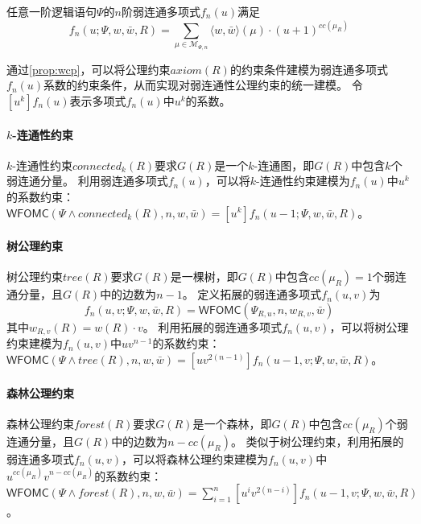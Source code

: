\documentclass[12pt,UTF8,AutoFakeBold=3,a4paper]{ctexart} %
\newcommand{\weight}{w}
\newcommand{\negweight}{\bar{w}}
\newcommand{\symwfomc}{\ensuremath{\mathsf{WFOMC}}}
\newcommand{\fomodels}[2]{\mathcal{M}_{#1, #2}}
\newcommand{\typeweight}[1]{\langle \weight, \negweight\rangle(#1)}
\begin{document}
\begin{proposition}\label{prop:wcp}
  任意一阶逻辑语句$\Psi$的$n$阶弱连通多项式$f_n(u)$满足
  \begin{equation*}
    f_n(u;\Psi, \weight, \negweight, R) = \sum_{\mu \in \fomodels{\Psi}{n}} \typeweight{\mu} \cdot (u+1)^{cc(\mu_R)}
  \end{equation*}
\end{proposition}

通过\cref{prop:wcp}，可以将公理约束$axiom(R)$的约束条件建模为弱连通多项式$f_n(u)$系数的约束条件，从而实现对弱连通性公理约束的统一建模。
令$[u^k] f_n(u)$表示多项式$f_n(u)$中$u^k$的系数。

\paragraph{$k$-连通性约束} $k$-连通性约束$connected_k(R)$要求$G(R)$是一个$k$-连通图，即$G(R)$中包含$k$个弱连通分量。
利用弱连通多项式$f_n(u)$，可以将$k$-连通性约束建模为$f_n(u)$中$u^k$的系数约束：$\symwfomc(\Psi \land connected_k(R), n, \weight, \negweight) = [u^k] f_n(u - 1; \Psi, \weight, \negweight, R)$。

\paragraph{树公理约束} 树公理约束$tree(R)$要求$G(R)$是一棵树，即$G(R)$中包含$cc(\mu_R) = 1$个弱连通分量，且$G(R)$中的边数为$n-1$。
定义拓展的弱连通多项式$f_n(u,v)$为
\begin{equation*}
  f_n(u, v; \Psi, \weight, \negweight, R) = \symwfomc(\Psi_{R,u}, n, \weight_{R,v}, \negweight)
\end{equation*}
其中$\weight_{R,v}(R) = \weight(R) \cdot v$。
利用拓展的弱连通多项式$f_n(u,v)$，可以将树公理约束建模为$f_n(u,v)$中$uv^{n-1}$的系数约束：$\symwfomc(\Psi \land tree(R), n, \weight, \negweight) = [uv^{2(n-1)} ] f_n(u-1, v; \Psi, \weight, \negweight, R)$。

\paragraph{森林公理约束} 森林公理约束$forest(R)$要求$G(R)$是一个森林，即$G(R)$中包含$cc(\mu_R)$个弱连通分量，且$G(R)$中的边数为$n - cc(\mu_R)$。
类似于树公理约束，利用拓展的弱连通多项式$f_n(u,v)$，可以将森林公理约束建模为$f_n(u,v)$中$u^{cc(\mu_R)}v^{n-cc(\mu_R)}$的系数约束：$\symwfomc(\Psi \land forest(R), n, \weight, \negweight) = \sum_{i=1}^n [u^iv^{2(n-i)}] f_n(u-1, v; \Psi, \weight, \negweight, R)$。
\end{document}
